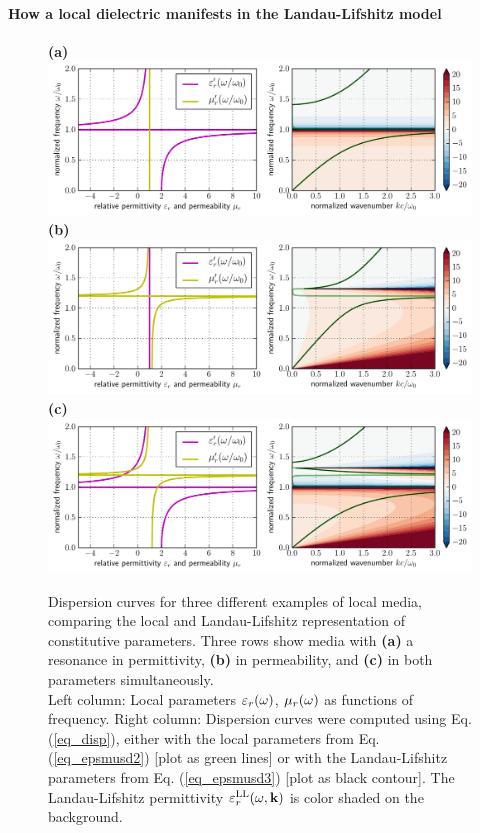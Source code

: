 \paragraph{How a local dielectric manifests in the Landau-Lifshitz model} %
\begin{figure}[h] \caption{Dispersion curves for three different examples of local media, comparing the local and Landau-Lifshitz representation of constitutive parameters. Three rows show media with \textbf{(a)} a  resonance in permittivity, \textbf{(b)} in permeability, and \textbf{(c)} in both parameters simultaneously.\\
Left column: Local parameters $\varepsilon_r(\omega)$, $\mu_r(\omega)$ as functions of frequency. Right column: Dispersion curves were computed using Eq. (\ref{eq_disp}), either with the local parameters from Eq. (\ref{eq_epsmusd2}) [plot as green lines] or with the Landau-Lifshitz parameters from Eq. (\ref{eq_epsmusd3}) [plot as black contour]. The Landau-Lifshitz permittivity $\varepsilon_r^\text{LL}(\omega,{\mathbf{k}})$ is color shaded on the background.
} \label{fg_dcll} \centering  
\textbf{(a)}\\\includegraphics[width=1\textwidth]{img/dispersion_landau_lifshitz/dispersion_ll_el.pdf}    
\textbf{(b)}\\\includegraphics[width=1\textwidth]{img/dispersion_landau_lifshitz/dispersion_ll_mag.pdf}
\textbf{(c)}\\\includegraphics[width=1\textwidth]{img/dispersion_landau_lifshitz/dispersion_ll_elmag.pdf}
\end{figure}
\clearpage

